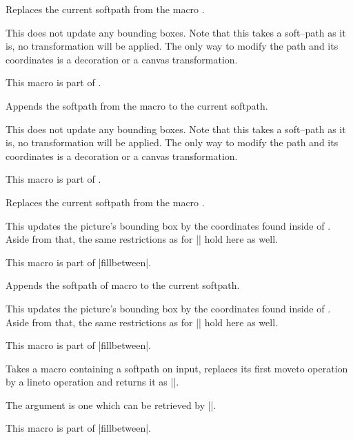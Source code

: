 \begin{command}{\pgfsetpath{}}
	Replaces the current softpath from the macro .

	This does not update any bounding boxes. Note that this takes a soft--path as it is, no transformation will be applied. The only way to modify the path and its coordinates is a decoration or a canvas transformation.

	This macro is part of \pgfname.
\end{command}
\begin{command}{\pgfaddpath{}}
	Appends the softpath from the macro  to the current softpath.

	This does not update any bounding boxes. Note that this takes a soft--path as it is, no transformation will be applied. The only way to modify the path and its coordinates is a decoration or a canvas transformation.

	This macro is part of \pgfname.
\end{command}

\begin{command}{\pgfsetpathandBB{}}
	Replaces the current softpath from the macro .

	This updates the picture's bounding box by the coordinates found inside of . Aside from that, the same restrictions as for |\pgfsetpath| hold here as well.

	This macro is part of |fillbetween|.
\end{command}

\begin{command}{\pgfaddpathandBB{}}
	Appends the softpath of macro  to the current softpath.

	This updates the picture's bounding box by the coordinates found inside of . Aside from that, the same restrictions as for |\pgfsetpath| hold here as well.

	This macro is part of |fillbetween|.
\end{command}

\begin{command}{\pgfpathreplacefirstmoveto{}}
	Takes a macro containing a softpath on input, replaces its first moveto operation by a lineto operation and returns it as |\pgfretval|.

	The argument  is one which can be retrieved by |\pgfgetpath|.

	This macro is part of |fillbetween|.
\end{command}

